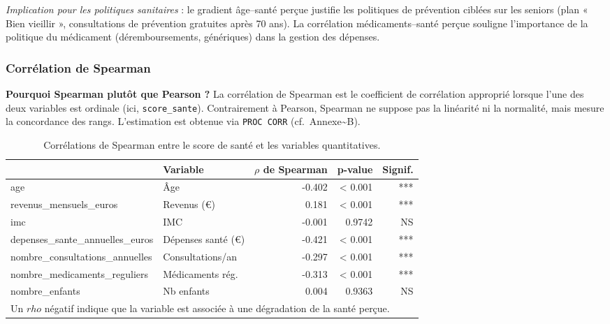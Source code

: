 \documentclass[11pt,a4paper]{memoirerecherche}
\begin{document}
\emph{Implication pour les politiques sanitaires} : le gradient âge--santé perçue justifie les politiques de prévention ciblées sur les seniors (plan « Bien vieillir », consultations de prévention gratuites après 70 ans). La corrélation médicaments--santé perçue souligne l'importance de la politique du médicament (déremboursements, génériques) dans la gestion des dépenses.

\hypertarget{corruxe9lation-de-spearman}{%
\subsubsection{Corrélation de Spearman}\label{corruxe9lation-de-spearman}}

\textbf{Pourquoi Spearman plutôt que Pearson ?} La corrélation de Spearman est le coefficient de corrélation approprié lorsque l'une des deux variables est ordinale (ici, \texttt{score\_sante}). Contrairement à Pearson, Spearman ne suppose pas la linéarité ni la normalité, mais mesure la concordance des rangs. L'estimation est obtenue via \texttt{PROC\ CORR} (cf.~Annexe\textasciitilde B).

\begin{table}[!h]
\centering
\caption{\label{tab:tab-spearman}Corrélations de Spearman entre le score de santé et les variables quantitatives.}
\centering
\fontsize{9}{11}\selectfont
\begin{tabular}[t]{llrrr}
\toprule
  & Variable & $\rho$ de Spearman & p-value & Signif.\\
\midrule
age & Âge & -0.402 & < 0.001 & ***\\
revenus_mensuels_euros & Revenus (€) & 0.181 & < 0.001 & ***\\
imc & IMC & -0.001 & 0.9742 & NS\\
depenses_sante_annuelles_euros & Dépenses santé (€) & -0.421 & < 0.001 & ***\\
nombre_consultations_annuelles & Consultations/an & -0.297 & < 0.001 & ***\\
\addlinespace
nombre_medicaments_reguliers & Médicaments rég. & -0.313 & < 0.001 & ***\\
nombre_enfants & Nb enfants & 0.004 & 0.9363 & NS\\
\bottomrule
\multicolumn{5}{l}{\rule{0pt}{1em}Un $rho$ négatif indique que la variable est associée à une dégradation de la santé perçue.}\\
\end{tabular}
\end{table}
\end{document}
